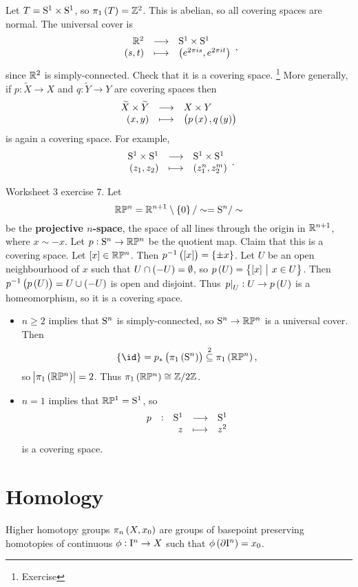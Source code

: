 \begin{example*}
Let $ T = \S^1 \times \S^1 $, so $ \pi_1\br{T} = \ZZ^2 $. This is abelian, so all covering spaces are normal. The universal cover is
$$ \function{\RR^2}{\S^1 \times \S^1}{\br{s, t}}{\br{e^{2\pi is}, e^{2\pi it}}}, $$
since $ \RR^2 $ is simply-connected. Check that it is a covering space. \footnote{Exercise} More generally, if $ p : \widetilde{X} \to X $ and $ q : \widetilde{Y} \to Y $ are covering spaces then
$$ \function{\widetilde{X} \times \widetilde{Y}}{X \times Y}{\br{x, y}}{\br{p\br{x}, q\br{y}}} $$
is again a covering space. For example,
$$ \function{\S^1 \times \S^1}{\S^1 \times \S^1}{\br{z_1, z_2}}{\br{z_1^n, z_2^m}}. $$
\end{example*}

\begin{example*}
Worksheet $ 3 $ exercise $ 7 $. Let
$$ \RR\PP^n = \RR^{n + 1} \setminus \cbr{0} / \sim = \S^n / \sim $$
be the \textbf{projective $ n $-space}, the space of all lines through the origin in $ \RR^{n + 1} $, where $ x \sim -x $. Let $ p : \S^n \to \RR\PP^n $ be the quotient map. Claim that this is a covering space. Let $ \sbr{x} \in \RR\PP^n $. Then $ p^{-1}\br{\sbr{x}} = \cbr{\pm x} $. Let $ U $ be an open neighbourhood of $ x $ such that $ U \cap \br{-U} = \emptyset $, so $ p\br{U} = \cbr{\sbr{x} \st x \in U} $. Then $ p^{-1}\br{p\br{U}} = U \cup \br{-U} $ is open and disjoint. Thus $ \eval{p}_U : U \to p\br{U} $ is a homeomorphism, so it is a covering space.
\begin{itemize}
\item $ n \ge 2 $ implies that $ \S^n $ is simply-connected, so $ \S^n \to \RR\PP^n $ is a universal cover. Then
$$ \cbr{\id} = p_*\br{\pi_1\br{\S^n}} \overset{2}{\subseteq} \pi_1\br{\RR\PP^n}, $$
so $ \abs{\pi_1\br{\RR\PP^n}} = 2 $. Thus $ \pi_1\br{\RR\PP^n} \cong \ZZ / 2\ZZ $.
\item $ n = 1 $ implies that $ \RR\PP^1 = \S^1 $, so
$$ \function[p]{\S^1}{\S^1}{z}{z^2} $$
is a covering space.
\end{itemize}
\end{example*}

\pagebreak

\section{Homology}


Higher homotopy groups $ \pi_n\br{X, x_0} $ are groups of basepoint preserving homotopies of continuous $ \phi : \I^n \to X $ such that $ \phi\br{\da \I^n} = x_0 $.

